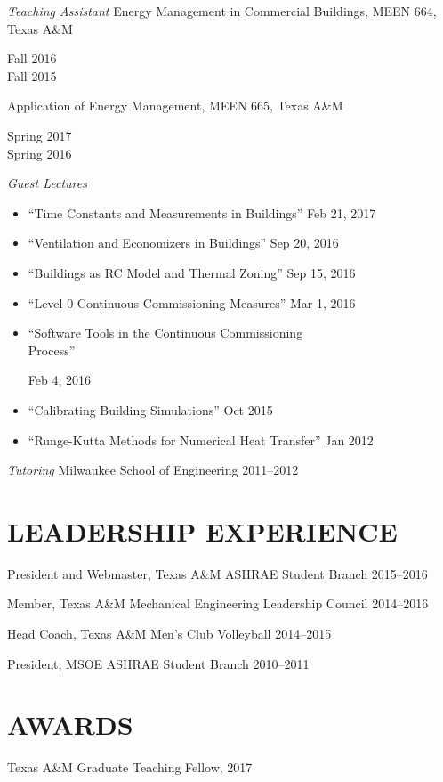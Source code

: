 \documentclass[margin]{res} %
\begin{document}
\begin{resume}
{\sl Teaching Assistant}\newline
Energy Management in Commercial Buildings, MEEN 664, Texas A\&M \hfill \parbox[t]{1.5cm}{\raggedleft Fall 2016 \\ Fall 2015} \par

\vspace{10pt}

Application of Energy Management, MEEN 665, Texas A\&M \hfill \parbox[t]{2cm}{\raggedleft Spring 2017 \\ Spring 2016}

\vspace{10pt}
{\sl Guest Lectures}
\begin{itemize}
\item ``Time Constants and Measurements in Buildings'' \hfill Feb 21, 2017
\item ``Ventilation and Economizers in Buildings'' \hfill Sep 20, 2016
\item ``Buildings as RC Model and Thermal Zoning'' \hfill Sep 15, 2016
\item ``Level 0 Continuous Commissioning Measures'' \hfill Mar 1, 2016
\item  \parbox{10cm}{``Software Tools in the Continuous Commissioning \\ Process''} \hfill Feb 4, 2016
\item ``Calibrating Building Simulations'' \hfill Oct 2015
\item ``Runge-Kutta Methods for Numerical Heat Transfer'' \hfill Jan 2012
\end{itemize}

\medskip


{\sl Tutoring} \newline
Milwaukee School of Engineering \hfill 2011--2012

\section{LEADERSHIP EXPERIENCE}

President and Webmaster, Texas A\&M ASHRAE Student Branch \hfill 2015--2016

Member, Texas A\&M Mechanical Engineering Leadership Council \hfill 2014--2016

Head Coach, Texas A\&M Men's Club Volleyball \hfill 2014--2015\

President, MSOE ASHRAE Student Branch \hfill 2010--2011

\section{AWARDS}
Texas A\&M Graduate Teaching Fellow, 2017


\end{resume}
\end{document}
